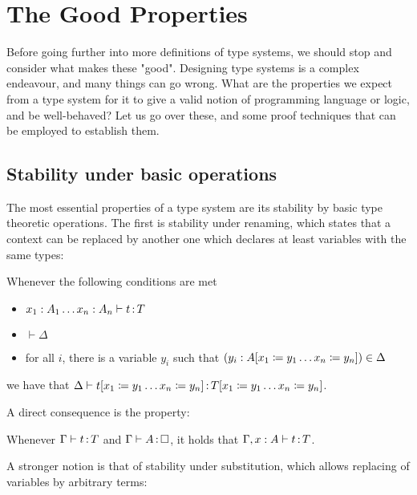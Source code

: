 \section{The Good Properties}
\label{sec:tech-properties}

Before going further into more definitions of type systems, we should stop and consider
what makes these "good". Designing type systems is a complex endeavour,
and many things can go wrong. What are the properties we expect from a type
system for it to give a valid notion of programming language or logic, and be well-behaved?
Let us go over these, and some proof techniques that can be employed to establish them.

\subsection{Stability under basic operations}

The most essential properties of a type system are its stability
by basic type theoretic operations.
The first is stability under renaming, which states that a context can be replaced by another
one which declares at least variables with the same types:

\begin{property}
  \label{prop:stab-renaming}
  Whenever the following conditions are met
  \begin{itemize}
    \item $x_1 : A_1 \dots x_n : A_n \vdash t \operatorname{:} T$
    \item $\vdash \Delta$
    \item for all $i$, there is a variable $y_i$ such that $(y_i : A[x_1 \coloneqq y_1 \dots x_n \coloneqq y_n]) \in \Delta$
  \end{itemize} 
  we have that $\Delta \vdash t[x_1 \coloneqq y_1 \dots x_n \coloneqq y_n] \operatorname{:} T[x_1 \coloneqq y_1 \dots x_n \coloneqq y_n]$.
\end{property}

A direct consequence is the  property:

\begin{property}
  \label{prop:weakening}
  Whenever $\Gamma \vdash t \operatorname{:} T$
  and $\Gamma \vdash A \ty \uni$, it holds that $\Gamma, x : A \vdash t \operatorname{:} T$.
\end{property}

A stronger notion is that of stability under substitution, which allows replacing of
variables by arbitrary terms:


